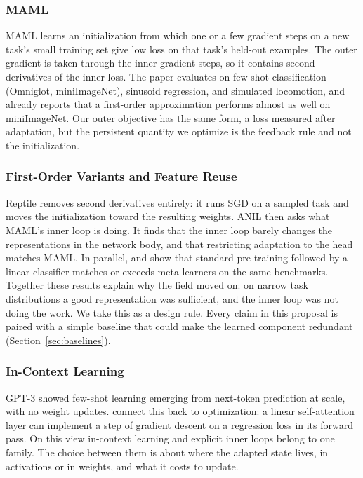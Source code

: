 \documentclass{article}
\begin{document}
\subsubsection{MAML}

MAML \parencite{finn2017maml} learns an initialization from which one or a few
gradient steps on a new task's small training set give low loss on that task's
held-out examples. The outer gradient is taken through the inner gradient
steps, so it contains second derivatives of the inner loss. The paper evaluates
on few-shot classification (Omniglot, miniImageNet), sinusoid regression, and
simulated locomotion, and already reports that a first-order approximation
performs almost as well on miniImageNet. Our outer objective has the same form,
a loss measured after adaptation, but the persistent quantity we optimize is
the feedback rule and not the initialization.

\subsubsection{First-Order Variants and Feature Reuse}

Reptile \parencite{nichol2018reptile} removes second derivatives entirely: it
runs SGD on a sampled task and moves the initialization toward the resulting
weights. ANIL \parencite{raghu2020anil} then asks what MAML's inner loop is
doing. It finds that the inner loop barely changes the representations in the
network body, and that restricting adaptation to the head matches MAML. In
parallel, \textcite{chen2019closer} and \textcite{tian2020rethinking} show that
standard pre-training followed by a linear classifier matches or exceeds
meta-learners on the same benchmarks. Together these results explain why the
field moved on: on narrow task distributions a good representation was
sufficient, and the inner loop was not doing the work. We take this as a design
rule. Every claim in this proposal is paired with a simple baseline that could
make the learned component redundant (Section~\ref{sec:baselines}).

\subsubsection{In-Context Learning}

GPT-3 \parencite{brown2020gpt3} showed few-shot learning emerging from
next-token prediction at scale, with no weight updates.
\textcite{vonoswald2023icl} connect this back to optimization: a linear
self-attention layer can implement a step of gradient descent on a regression
loss in its forward pass. On this view in-context learning and explicit inner
loops belong to one family. The choice between them is about where the adapted
state lives, in activations or in weights, and what it costs to update.
\end{document}
